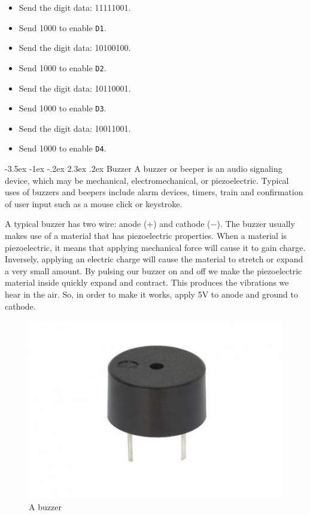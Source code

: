 \documentclass[a4paper,twoside]{report}
\makeatletter
\renewcommand\section{\@startsection {section}{1}{-1em}%
  {-3.5ex \@plus -1ex \@minus -.2ex}%
  {2.3ex \@plus.2ex}%
  {\normalfont\Large\bfseries}}
\makeatother
\begin{document}
\begin{multicols}{2}
\begin{itemize}
\item Send the  digit data: 11111001.
\item Send 1000 to enable \texttt{D1}.

\item Send the  digit data: 10100100.
\item Send 1000 to enable \texttt{D2}.

\item Send the  digit data: 10110001.
\item Send 1000 to enable \texttt{D3}.

\item Send the  digit data: 10011001.
\item Send 1000 to enable \texttt{D4}.
\end{itemize}
\end{multicols}

\section{Buzzer}
A buzzer or beeper is an audio signaling device, which may be mechanical, electromechanical, or piezoelectric. Typical uses of buzzers and beepers include alarm devices, timers, train and confirmation of user input such as a mouse click or keystroke.

A typical buzzer has two wire: anode (+) and cathode ($-$). The buzzer usually makes use of a material that has piezoelectric properties. When a material is piezoelectric, it means that applying mechanical force will cause it to gain charge. Inversely, applying an electric charge will cause the material to stretch or expand a very small amount. By pulsing our buzzer on and off we make the piezoelectric material inside quickly expand and contract. This produces the vibrations we hear in the air. So, in order to make it works, apply 5V to anode and ground to cathode.

\begin{figure}[H]
\centering
\includegraphics[scale=0.2]{images/buzzer.jpg}
\caption{A buzzer}
\end{figure}
\end{document}
